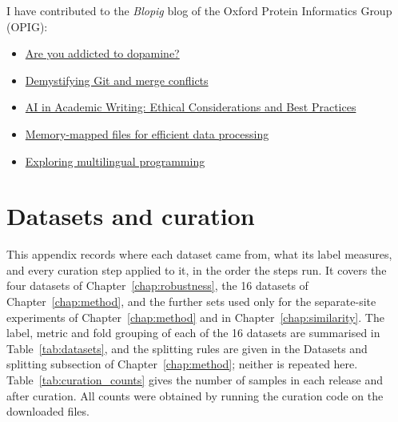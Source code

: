 I have contributed to the \textit{Blopig} blog of the Oxford Protein Informatics Group (OPIG):

\begin{itemize}
    \item \href{https://www.blopig.com/blog/2025/10/are-you-addicted-to-dopamine/}{Are you addicted to dopamine?}
    \item \href{https://www.blopig.com/blog/2025/05/demystifying-git-and-merge-conflicts/}{Demystifying Git and merge conflicts}
    \item \href{https://www.blopig.com/blog/2025/03/ai-in-academic-writing-ethical-considerations-and-best-practices/}{AI in Academic Writing: Ethical Considerations and Best Practices}
    \item \href{https://www.blopig.com/blog/2024/08/memory-mapped-files-for-efficient-data-processing/}{Memory-mapped files for efficient data processing}
    \item \href{https://www.blopig.com/blog/2024/04/exploring-multilingual-programming/}{Exploring multilingual programming}
\end{itemize}


\appendix

\chapter{Datasets and curation}\label{app:datasets}


This appendix records where each dataset came from, what its label measures, and every curation step applied to it, in the order the steps run. It covers the four datasets of Chapter~\ref{chap:robustness}, the 16 datasets of Chapter~\ref{chap:method}, and the further sets used only for the separate-site experiments of Chapter~\ref{chap:method} and in Chapter~\ref{chap:similarity}. The label, metric and fold grouping of each of the 16 datasets are summarised in Table~\ref{tab:datasets}, and the splitting rules are given in the Datasets and splitting subsection of Chapter~\ref{chap:method}; neither is repeated here. Table~\ref{tab:curation_counts} gives the number of samples in each release and after curation. All counts were obtained by running the curation code on the downloaded files.


